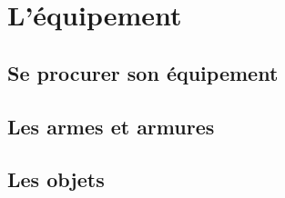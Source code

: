 \chapter{L'équipement}

\section{Se procurer son équipement}


\section{Les armes et armures}


\section{Les objets}
